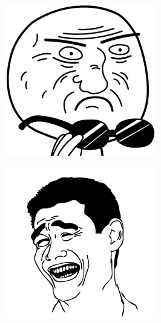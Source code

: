 \begin{multicols}{8}
\begin{center}
\includegraphics[width=\linewidth]{./IMG-GIT/MEMES/Meme-faces-gafas-de-sol.jpg}
\end{center}

\begin{center}
\includegraphics[width=\linewidth]{./IMG-GIT/MEMES/Meme-cara-Yao-Ming.jpg}       
\end{center}


\end{multicols}
